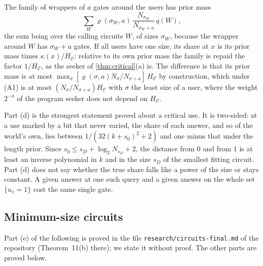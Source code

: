 The family of wrappers of $a$ gates around the users has prior mass
\[
\sum_W\varrho(\sigma_W,a)\,\frac{N_{\sigma_W}}{N_{\sigma_W+a}}\,q(W),
\]
the sum being over the calling circuits $W$, of sizes $\sigma_W$, because the wrapper around $W$ has
$\sigma_W+a$ gates. If all users have one size, its share at $x$ is its prior mass times
$\kappa(x)/H_{\mathcal C}$: relative to its own prior mass the family is repaid the factor $1/H_{\mathcal C}$,
as the seeker of \cref{thm:critical}(a) is. The difference is that its prior mass is at most
$\max_\sigma[\varrho(\sigma,a)N_\sigma/N_{\sigma+a}]\,H_{\mathcal C}$ by construction, which under (A1) is at
most $(N_\sigma/N_{\sigma+a})H_{\mathcal C}$ with $\sigma$ the least size of a user, where the weight $2^{-a}$
of the program seeker does not depend on $H_{\mathcal C}$.

Part (d) is the strongest statement proved about a critical use. It is two-sided: at a use marked by a bit
that never varied, the share of each answer, and so of the world's own, lies between $1/(32(k+s_0)^2+2)$ and
one minus that under the length prior. Since $s_0\le s_D+\log_2N_{s_D}+2$, the distance from $0$ and from $1$
is at least an inverse polynomial in $k$ and in the size $s_D$ of the smallest fitting circuit. Part (d) does
not say whether the true share falls like a power of the size or stays constant. A given answer at one such
query and a given answer on the whole set $\{u_v=1\}$ cost the same single gate.

\subsection{Minimum-size circuits}

Part (e) of the following is proved in the file \texttt{research/circuits-final.md} of the repository
(Theorem~11(b) there); we state it without proof. The other parts are proved below.

